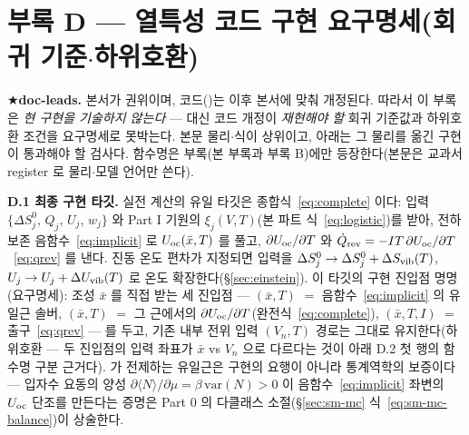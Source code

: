 \section*{부록 D --- 열특성 코드 구현 요구명세(회귀 기준$\cdot$하위호환)}
\label{sec:codemap-thermal}

★\textbf{doc-leads.} 본서가 권위이며, 코드()는 이후 본서에 맞춰 개정된다. 따라서 이
부록은 \emph{현 구현을 기술하지 않는다} --- 대신 코드 개정이 \emph{재현해야 할} 회귀 기준값과 하위호환 조건을
요구명세로 못박는다. 본문 물리$\cdot$식이 상위이고, 아래는 그 물리를 옮긴 구현이 통과해야 할 검사다. 함수명은
부록(본 부록과 부록 B)에만 등장한다(본문은 교과서 register 로 물리$\cdot$모델 언어만 쓴다).

\textbf{D.1 최종 구현 타깃.} 실전 계산의 유일 타깃은 종합식~\eqref{eq:complete} 이다: 입력
$\{\Delta S^0_j,\,Q_j,\,U_j,\,w_j\}$ 와 Part I 기원의 $\xi_j(V,T)$(본 파트 식~\eqref{eq:logistic})를 받아, 전하 보존
음함수~\eqref{eq:implicit} 로 $U_{\mathrm{oc}}(\bar x,T)$ 를 풀고, $\partial U_{\mathrm{oc}}/\partial T$ 와 $\dot Q_{\mathrm{rev}}=-IT\,\partial
U_{\mathrm{oc}}/\partial T$~\eqref{eq:qrev} 를 낸다. 진동 온도 편차가 지정되면 입력을 $\Delta S^0_j\to\Delta
S^0_j+\Delta S_{\mathrm{vib}}(T)$, $U_j\to U_j+\Delta U_{\mathrm{vib}}(T)$ 로 온도 확장한다(\S\ref{sec:einstein}).
이 타깃의 구현 진입점 명명(요구명세): 조성 $\bar x$ 를 직접 받는 세 진입점 ---
$(\bar x,T)$ $=$ 음함수~\eqref{eq:implicit} 의 유일근 솔버,
$(\bar x,T)$ $=$ 그 근에서의 $\partial U_{\mathrm{oc}}/\partial T$(완전식~\eqref{eq:complete}),
$(\bar x,T,I)$ $=$ 출구~\eqref{eq:qrev} --- 를 두고, 기존 내부 전위 입력
$(V_n,T)$ 경로는 그대로 유지한다(하위호환 --- 두 진입점의 입력 좌표가
$\bar x$ vs $V_n$ 으로 다르다는 것이 아래 D.2 첫 행의 함수명 구분 근거다).  가 전제하는
유일근은 구현의 요행이 아니라 통계역학의 보증이다 --- 입자수 요동의 양성
$\partial\langle N\rangle/\partial\mu=\beta\,\mathrm{var}(N)>0$ 이 음함수~\eqref{eq:implicit} 좌변의 $U_{\mathrm{oc}}$
단조를 만든다는 증명은 Part 0 의 다클래스 소절(\S\ref{sec:sm-mc} 식~\eqref{eq:sm-mc-balance})이 상술한다.

